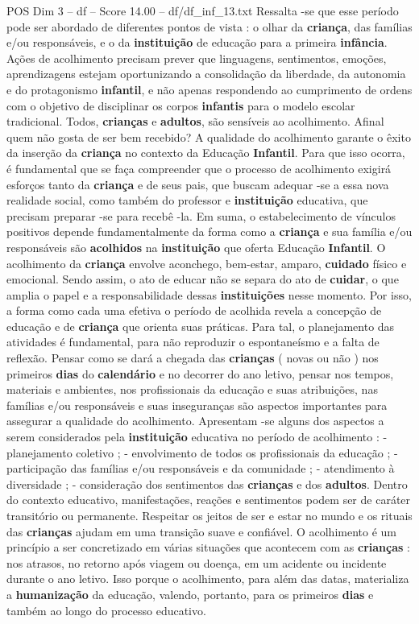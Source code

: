 \begin{textsample}{POS Dim 3 – df – Score 14.00 – df/df\_inf\_13.txt}
Ressalta -se que esse período pode ser abordado de diferentes pontos de vista : o olhar da \textbf{criança}, das famílias e/ou responsáveis, e o da \textbf{instituição} de educação para a primeira \textbf{infância}.
Ações de acolhimento precisam prever que linguagens, sentimentos, emoções, aprendizagens estejam oportunizando a consolidação da liberdade, da autonomia e do protagonismo \textbf{infantil}, e não apenas respondendo ao cumprimento de ordens com o objetivo de disciplinar os corpos \textbf{infantis} para o modelo escolar tradicional.
Todos, \textbf{crianças} e \textbf{adultos}, são sensíveis ao acolhimento.
Afinal quem não gosta de ser bem recebido?
A qualidade do acolhimento garante o êxito da inserção da \textbf{criança} no contexto da Educação \textbf{Infantil}.
Para que isso ocorra, é fundamental que se faça compreender que o processo de acolhimento exigirá esforços tanto da \textbf{criança} e de seus pais, que buscam adequar -se a essa nova realidade social, como também do professor e \textbf{instituição} educativa, que precisam preparar -se para recebê -la.
Em suma, o estabelecimento de vínculos positivos depende fundamentalmente da forma como a \textbf{criança} e sua família e/ou responsáveis são \textbf{acolhidos} na \textbf{instituição} que oferta Educação \textbf{Infantil}.
O acolhimento da \textbf{criança} envolve aconchego, bem-estar, amparo, \textbf{cuidado} físico e emocional.
Sendo assim, o ato de educar não se separa do ato de \textbf{cuidar}, o que amplia o papel e a responsabilidade dessas \textbf{instituições} nesse momento.
Por isso, a forma como cada uma efetiva o período de acolhida revela a concepção de educação e de \textbf{criança} que orienta suas práticas.
Para tal, o planejamento das atividades é fundamental, para não reproduzir o espontaneísmo e a falta de reflexão.
Pensar como se dará a chegada das \textbf{crianças} ( novas ou não ) nos primeiros \textbf{dias} do \textbf{calendário} e no decorrer do ano letivo, pensar nos tempos, materiais e ambientes, nos profissionais da educação e suas atribuições, nas famílias e/ou responsáveis e suas inseguranças são aspectos importantes para assegurar a qualidade do acolhimento.
Apresentam -se alguns dos aspectos a serem considerados pela \textbf{instituição} educativa no período de acolhimento : - planejamento coletivo ; - envolvimento de todos os profissionais da educação ; - participação das famílias e/ou responsáveis e da comunidade ; - atendimento à diversidade ; - consideração dos sentimentos das \textbf{crianças} e dos \textbf{adultos}.
Dentro do contexto educativo, manifestações, reações e sentimentos podem ser de caráter transitório ou permanente.
Respeitar os jeitos de ser e estar no mundo e os rituais das \textbf{crianças} ajudam em uma transição suave e confiável.
O acolhimento é um princípio a ser concretizado em várias situações que acontecem com as \textbf{crianças} : nos atrasos, no retorno após viagem ou doença, em um acidente ou incidente durante o ano letivo.
Isso porque o acolhimento, para além das datas, materializa a \textbf{humanização} da educação, valendo, portanto, para os primeiros \textbf{dias} e também ao longo do processo educativo.


\end{textsample}
